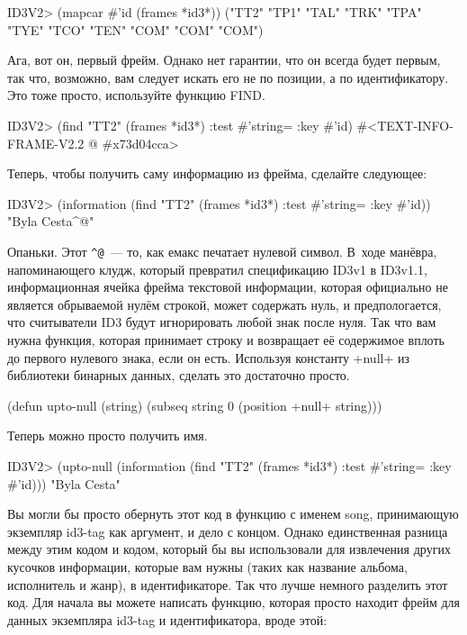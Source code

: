 \begin{myverb}
ID3V2> (mapcar #'id (frames *id3*))
("TT2" "TP1" "TAL" "TRK" "TPA" "TYE" "TCO" "TEN" "COM" "COM" "COM")
\end{myverb}

Ага, вот он, первый фрейм. Однако нет гарантии, что он всегда будет первым, так что, возможно,
вам следует искать его не по позиции, а по идентификатору. Это тоже просто, используйте
функцию FIND.

\begin{myverb}
ID3V2> (find "TT2" (frames *id3*) :test #'string= :key #'id)
#<TEXT-INFO-FRAME-V2.2 @ #x73d04cca>
\end{myverb}

Теперь, чтобы получить саму информацию из фрейма, сделайте следующее:

\begin{myverb}
ID3V2> (information (find "TT2" (frames *id3*) :test #'string= :key #'id))
"Byla Cesta^@"
\end{myverb}

Опаньки. Этот \lstinline!^@!~--- то, как емакс печатает нулевой символ. В~ходе манёвра,
напоминающего клудж, который превратил спецификацию ID3v1 в ID3v1.1, информационная ячейка
фрейма текстовой информации, которая официально не является обрываемой нулём строкой,
может содержать нуль, и предпологается, что считыватели ID3 будут игнорировать любой знак
после нуля. Так что вам нужна функция, которая принимает строку и возвращает её
содержимое вплоть до первого нулевого знака, если он есть. Используя константу +null+ из
библиотеки бинарных данных, сделать это достаточно просто.

\begin{myverb}
(defun upto-null (string)
  (subseq string 0 (position +null+ string)))
\end{myverb}

Теперь можно просто получить имя.

\begin{myverb}
ID3V2> (upto-null (information (find "TT2" (frames *id3*) :test #'string= :key #'id)))
"Byla Cesta"
\end{myverb}

Вы могли бы просто обернуть этот код в функцию с именем song, принимающую экземпляр
id3-tag как аргумент, и дело с концом. Однако единственная разница между этим кодом и
кодом, который бы вы использовали для извлечения других кусочков информации, которые вам
нужны (таких как название альбома, исполнитель и жанр), в идентификаторе. Так что лучше
немного разделить этот код. Для начала вы можете написать функцию, которая просто находит
фрейм для данных экземпляра id3-tag и идентификатора, вроде этой:

